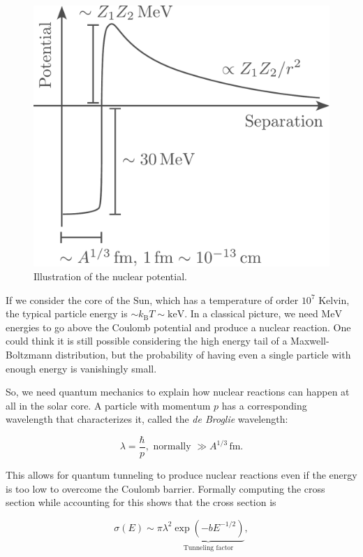 \documentclass[twocolumn]{article}
\begin{document}
\begin{figure}
\centering
\includegraphics{../assets/7_nucleo1/potential.pdf}
\caption{Illustration of the nuclear potential.}
\end{figure}

If we consider the core of the Sun, which has a temperature of order
\(10^7\) Kelvin, the typical particle energy is
\(\sim k_\mathrm{B}T\sim \mathrm{keV}\). In a classical picture, we need
\(\mathrm{MeV}\) energies to go above the Coulomb potential and produce
a nuclear reaction. One could think it is still possible considering the
high energy tail of a Maxwell-Boltzmann distribution, but the
probability of having even a single particle with enough energy is
vanishingly small.

So, we need quantum mechanics to explain how nuclear reactions can
happen at all in the solar core. A particle with momentum \(p\) has a
corresponding wavelength that characterizes it, called the \emph{de
Broglie} wavelength:

\[\lambda = \frac{\hbar}{p},\text{ normally $\gg A^{1/3}\,\mathrm{fm}$}.\]

This allows for quantum tunneling to produce nuclear reactions even if
the energy is too low to overcome the Coulomb barrier. Formally
computing the cross section while accounting for this shows that the
cross section is

\[\sigma(E)\sim \pi \lambda^2\underbrace{\exp(-b E^{-1/2})}_\text{Tunneling factor},\]
\end{document}
